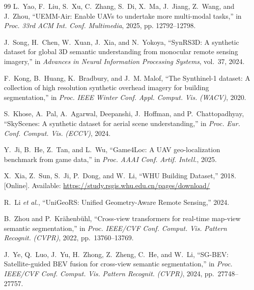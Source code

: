 \documentclass[letterpaper,journal]{IEEEtran}
\begin{document}
\begin{thebibliography}{99}
L.~Yao, F.~Liu, S.~Xu, C.~Zhang, S.~Di, X.~Ma, J.~Jiang, Z.~Wang, and J.~Zhou, ``UEMM-Air: Enable UAVs to undertake more multi-modal tasks,'' in \textit{Proc. 33rd ACM Int. Conf. Multimedia}, 2025, pp. 12792--12798.

J.~Song, H.~Chen, W.~Xuan, J.~Xia, and N.~Yokoya, ``SynRS3D: A synthetic dataset for global 3D semantic understanding from monocular remote sensing imagery,'' in \textit{Advances in Neural Information Processing Systems}, vol.~37, 2024.

F.~Kong, B.~Huang, K.~Bradbury, and J.~M. Malof, ``The Synthinel-1 dataset: A collection of high resolution synthetic overhead imagery for building segmentation,'' in \textit{Proc. IEEE Winter Conf. Appl. Comput. Vis. (WACV)}, 2020.

S.~Khose, A.~Pal, A.~Agarwal, Deepanshi, J.~Hoffman, and P.~Chattopadhyay, ``SkyScenes: A synthetic dataset for aerial scene understanding,'' in \textit{Proc. Eur. Conf. Comput. Vis. (ECCV)}, 2024.

Y.~Ji, B.~He, Z.~Tan, and L.~Wu, ``Game4Loc: A UAV geo-localization benchmark from game data,'' in \textit{Proc. AAAI Conf. Artif. Intell.}, 2025.

X.~Xia, Z.~Sun, S.~Ji, P.~Dong, and W.~Li, ``WHU Building Dataset,'' 2018. [Online]. Available: \url{https://study.rsgis.whu.edu.cn/pages/download/}

R.~Li \textit{et al.}, ``UniGeoRS: Unified Geometry-Aware Remote Sensing,'' 2024.

B.~Zhou and P.~Kr\"ahenb\"uhl, ``Cross-view transformers for real-time map-view semantic segmentation,'' in \textit{Proc. IEEE/CVF Conf. Comput. Vis. Pattern Recognit. (CVPR)}, 2022, pp.~13760--13769.

J.~Ye, Q.~Luo, J.~Yu, H.~Zhong, Z.~Zheng, C.~He, and W.~Li, ``SG-BEV: Satellite-guided BEV fusion for cross-view semantic segmentation,'' in \textit{Proc. IEEE/CVF Conf. Comput. Vis. Pattern Recognit. (CVPR)}, 2024, pp.~27748--27757.

\end{thebibliography}


\vfill
\end{document}
